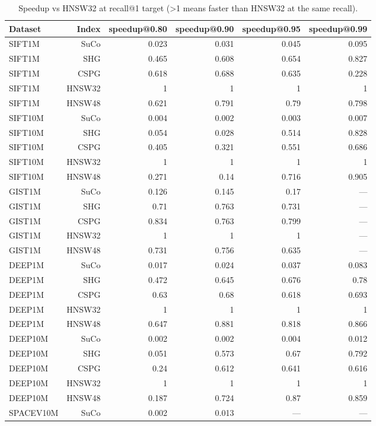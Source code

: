 \begin{table}[t]
\centering
\small
\caption{Speedup vs HNSW32 at recall@1 target (>1 means faster than HNSW32 at the same recall).}
\label{tab:speedup-k1}
\begin{tabular}{lrrrrr}
\toprule
Dataset & Index & speedup@0.80 & speedup@0.90 & speedup@0.95 & speedup@0.99 \\
\midrule
SIFT1M & SuCo & 0.023 & 0.031 & 0.045 & 0.095 \\
SIFT1M & SHG & 0.465 & 0.608 & 0.654 & 0.827 \\
SIFT1M & CSPG & 0.618 & 0.688 & 0.635 & 0.228 \\
SIFT1M & HNSW32 & 1 & 1 & 1 & 1 \\
SIFT1M & HNSW48 & 0.621 & 0.791 & 0.79 & 0.798 \\
SIFT10M & SuCo & 0.004 & 0.002 & 0.003 & 0.007 \\
SIFT10M & SHG & 0.054 & 0.028 & 0.514 & 0.828 \\
SIFT10M & CSPG & 0.405 & 0.321 & 0.551 & 0.686 \\
SIFT10M & HNSW32 & 1 & 1 & 1 & 1 \\
SIFT10M & HNSW48 & 0.271 & 0.14 & 0.716 & 0.905 \\
GIST1M & SuCo & 0.126 & 0.145 & 0.17 & — \\
GIST1M & SHG & 0.71 & 0.763 & 0.731 & — \\
GIST1M & CSPG & 0.834 & 0.763 & 0.799 & — \\
GIST1M & HNSW32 & 1 & 1 & 1 & — \\
GIST1M & HNSW48 & 0.731 & 0.756 & 0.635 & — \\
DEEP1M & SuCo & 0.017 & 0.024 & 0.037 & 0.083 \\
DEEP1M & SHG & 0.472 & 0.645 & 0.676 & 0.78 \\
DEEP1M & CSPG & 0.63 & 0.68 & 0.618 & 0.693 \\
DEEP1M & HNSW32 & 1 & 1 & 1 & 1 \\
DEEP1M & HNSW48 & 0.647 & 0.881 & 0.818 & 0.866 \\
DEEP10M & SuCo & 0.002 & 0.002 & 0.004 & 0.012 \\
DEEP10M & SHG & 0.051 & 0.573 & 0.67 & 0.792 \\
DEEP10M & CSPG & 0.24 & 0.612 & 0.641 & 0.616 \\
DEEP10M & HNSW32 & 1 & 1 & 1 & 1 \\
DEEP10M & HNSW48 & 0.187 & 0.724 & 0.87 & 0.859 \\
SPACEV10M & SuCo & 0.002 & 0.013 & — & — \\

\end{tabular}
\end{table}
